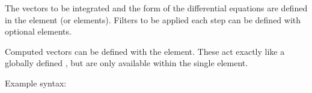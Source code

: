 \documentclass[letterpaper,10pt,english]{sphinxmanual}
\begin{document}
\sphinxAtStartPar
The vectors to be integrated and the form of the differential equations are defined in the {\hyperref[\detokenize{reference_elements:operatorselement}]{}} element (or elements).  Filters to be applied each step can be defined with optional {\hyperref[\detokenize{reference_elements:filterselement}]{}} elements.

\sphinxAtStartPar
Computed vectors can be defined with the  element.  These act exactly like a globally defined {\hyperref[\detokenize{reference_elements:computedvectorelement}]{}}, but are only available within the single  element.

\sphinxAtStartPar
Example syntax:
\end{document}
